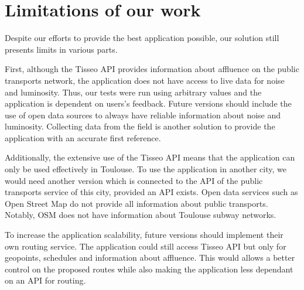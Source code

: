 \section{Limitations of our work}

Despite our efforts to provide the best application possible, our solution still presents limits in various parts.\newline

First, although the Tisseo API provides information about affluence on the public transports network, the application does not have access to live data for noise and luminosity. Thus, our tests were run using arbitrary values and the application is dependent on users’s feedback. Future versions should include the use of open data sources to always have reliable information about noise and luminosity. Collecting data from the field is another solution to provide the application with an accurate first reference.\newline

Additionally, the extensive use of the Tisseo API means that the application can only be used effectively in Toulouse. To use the application in another city, we would need another version which is connected to the API of the public transports service of this city, provided an API exists. Open data services such as Open Street Map do not provide all information about public transports. Notably, OSM does not have information about Toulouse subway networks.\newline

To increase the application scalability, future versions should implement their own routing service. The application could still access Tisseo API but only for geopoints, schedules and information about affluence. This would allows a better control on the proposed routes while also making the application less dependant on an API for routing.

